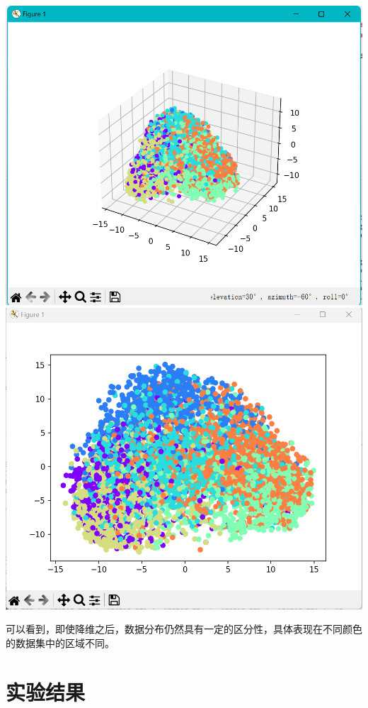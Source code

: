 \documentclass[11pt]{article}
\begin{document}
            \begin{center}
                \includegraphics[scale=0.8]{graph/transformer3.png}\\
                \includegraphics[scale=0.8]{graph/transformer4.png}
            \end{center}

            可以看到，即使降维之后，数据分布仍然具有一定的区分性，具体表现在不同颜色的数据集中的区域不同。

    \section{实验结果}
\end{document}
